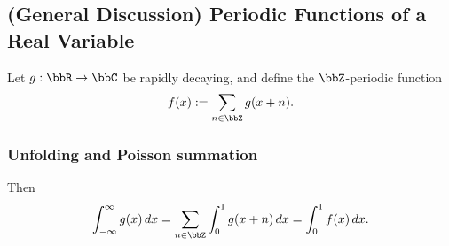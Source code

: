 \subsection{(General Discussion) Periodic Functions of a Real Variable}



Let $g:\bbR\to\bbC$ be rapidly decaying, and define the $\bbZ$-periodic function
\[
f(x):=\sum_{n\in\bbZ} g(x+n).
\]

\subsubsection{Unfolding and Poisson summation}

Then
\[
\int_{-\infty}^{\infty} g(x)\,dx = \sum_{n\in\bbZ} \int_0^1 g(x+n)\,dx = \int_0^1 f(x)\,dx.
\]

